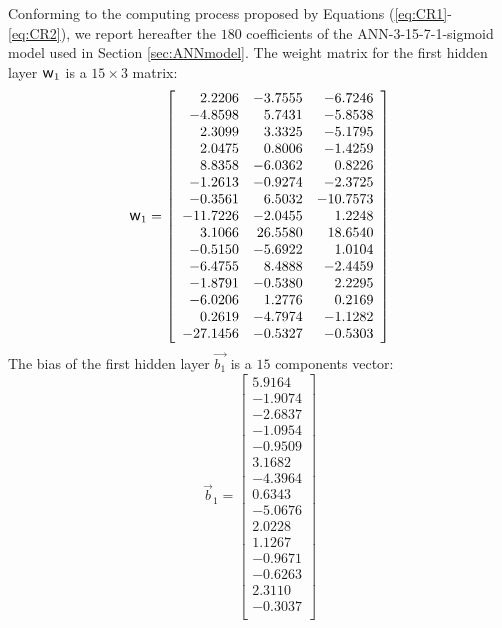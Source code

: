 \documentclass[twoside,english,1p,final,sort&compress]{elsarticle}
\theoremstyle{plain}
\DeclareRobustCommand{\w}{\mbox{\large\ensuremath{\mathsf{w}}}}
\begin{document}
Conforming to the computing process proposed by Equations (\ref{eq:CR1}-\ref{eq:CR2}), we report hereafter the $180$ coefficients of the ANN-3-15-7-1-sigmoid model used in Section \ref{sec:ANNmodel}.
The weight matrix for the first hidden layer $\w_1$ is a $15\times3$ matrix:
\begin{equation*}
\w_1 = \left[
\begin{array}{rrr}
2.2206 & -3.7555 & -6.7246\\
-4.8598 & 5.7431 & -5.8538\\
2.3099 & 3.3325 & -5.1795\\
2.0475 & 0.8006 & -1.4259\\
8.8358 & -6.0362 & 0.8226\\
-1.2613 & -0.9274 & -2.3725\\
-0.3561 & 6.5032 & -10.7573\\
-11.7226 & -2.0455 & 1.2248\\
3.1066 & 26.5580 & 18.6540\\
-0.5150 & -5.6922 & 1.0104\\
-6.4755 & 8.4888 & -2.4459\\
-1.8791 & -0.5380 & 2.2295\\
-6.0206 & 1.2776 & 0.2169\\
0.2619 & -4.7974 & -1.1282\\
-27.1456 & -0.5327 & -0.5303\\
\end{array}\right]
\end{equation*}
The bias of the first hidden layer $\overrightarrow{b_1}$ is a $15$ components vector:
\begin{equation*}
\overrightarrow{b}_1 = \left[
\begin{array}{r}
5.9164\\
-1.9074\\
-2.6837\\
-1.0954\\
-0.9509\\
3.1682\\
-4.3964\\
0.6343\\
-5.0676\\
2.0228\\
1.1267\\
-0.9671\\
-0.6263\\
2.3110\\
-0.3037\\
\end{array}\right]
\end{equation*}
\end{document}
